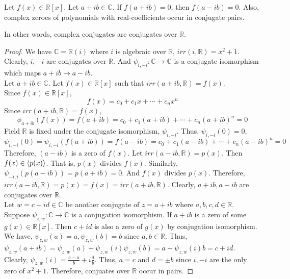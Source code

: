 \begin{corollary}
	Let $f(x) \in \mathbb{R}[x]$.
	Let $a+ib \in \mathbb{C}$.
	If $f(a+ib) = 0$, then $f(a-ib) = 0$.
	Also, complex zeroes of polynomials with real-coefficients occur in conjugate pairs.
\end{corollary}
\begin{important}
	In other words, complex conjugates are conjugates over $\mathbb{R}$.
\end{important}
\begin{proof} 
	We have $\mathbb{C} = \mathbb{R}(i)$ where $i$ is algebraic over $\mathbb{R}$, $irr(i,\mathbb{R}) = x^2+1$.
	Clearly, $i,-i$ are conjugates over $\mathbb{R}$.
	And $\psi_{i,-i} : \mathbb{C} \to \mathbb{C}$ is a conjugate isomorphism which maps $a+ib \to a-ib$.\\

	Let $a+ib \in \mathbb{C}$.
	Let $f(x) \in \mathbb{R}[x]$ such that $irr(a+ib,\mathbb{R}) = f(x)$.\\
	Since $f(x) \in \mathbb{R}[x]$,
	\[ f(x) = c_0 + c_1x + \dotsb + c_nx^n \]
	Since $irr(a+ib,\mathbb{R}) = f(x)$,
	\[ \phi_{a+ib}(f(x)) = f(a+ib) = c_0 + c_1(a+ib) + \dotsb + c_n(a+ib)^n = 0 \]
	Field $\mathbb{R}$ is fixed under the conjugate isomorphism, $\psi_{i,-i}$.
	Thus, $\psi_{i,-i}(0) = 0$,
	\[ \psi_{i,-i}(0) = \psi_{i,-i}(f(a+ib)) = f(a-ib) = c_0 + c_1(a-ib) + \dotsb + c_n(a-ib)^n = 0 \]
	Therefore, $(a-ib)$ is a zero of $f(x)$.
	Let $irr(a-ib,\mathbb{R}) = p(x)$.
	Then $f(x) \in \left\langle p(x)\right\rangle$.
	That is, $p(x)$ divides $f(x)$.
	Similarly, $\psi_{-i,i}(p(a-ib)) = p(a+ib) = 0$.
	And $f(x)$ divides $p(x)$.
	Therefore, $irr(a-ib,\mathbb{R}) = p(x) = f(x) = irr(a+ib,\mathbb{R})$.
	Clearly, $a+ib,a-ib$ are conjugates over $\mathbb{R}$.\\
	
	Let $w = c+id \in \mathbb{C}$ be another conjugate of $z=a+ib$ where $a,b,c,d \in \mathbb{R}$.
	Suppose $\psi_{z,w} : \mathbb{C} \to \mathbb{C}$ is a conjugation isomorphism.
	If $a+ib$ is a zero of some $g(x) \in \mathbb{R}[x]$.
	Then $c+id$ is also a zero of $g(x)$ by conjugation isomorphism.
	We have, $\psi_{z,w}(a) = a, \psi_{z,w}(b) = b$ since $a,b \in \mathbb{R}$.
	Thus, $\psi_{z,w}(a+ib) = \psi_{z,w}(a) + \psi_{z,w}(i)\psi_{z,w}(b) = a+\psi_{z,w}(i)b = c+id$.
	Clearly, $\psi_{z,w}(i) = \frac{c-a}{b} + i\frac{d}{b}$.
	Thus, $a=c$ and $d = \pm b$ since $i,-i$ are the only zero of $x^2+1$.
	Therefore, conjuates over $\mathbb{R}$ occur in pairs.
\end{proof} 


